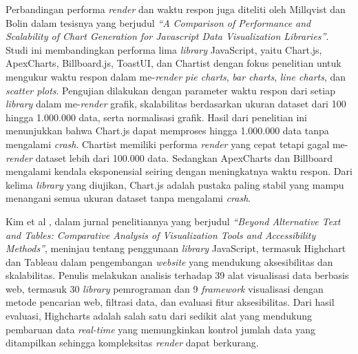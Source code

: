 Perbandingan performa \textit{render} dan waktu respon juga diteliti oleh Millqvist dan Bolin \cite{Millqvist2022} dalam tesisnya yang berjudul \textit{“A Comparison of Performance and Scalability of Chart Generation for Javascript Data Visualization Libraries”}. Studi ini membandingkan performa lima \textit{library} JavaScript, yaitu Chart.js, ApexCharts, Billboard.js, ToastUI, dan Chartist dengan fokus penelitian untuk mengukur waktu respon dalam me-\textit{render} \textit{pie charts}, \textit{bar charts}, \textit{line charts}, dan \textit{scatter plots}. Pengujian dilakukan dengan parameter waktu respon dari setiap \textit{library} dalam me-\textit{render} grafik, skalabilitas berdasarkan ukuran dataset dari 100 hingga 1.000.000 data, serta normalisasi grafik. Hasil dari penelitian ini menunjukkan bahwa Chart.js dapat memproses hingga 1.000.000 data tanpa mengalami \textit{crash}. Chartist memiliki performa \textit{render} yang cepat tetapi gagal me-\textit{render} dataset lebih dari 100.000 data. Sedangkan ApexCharts dan Billboard mengalami kendala eksponensial seiring dengan meningkatnya waktu respon. Dari kelima \textit{library} yang diujikan, Chart.js adalah pustaka paling stabil yang mampu menangani semua ukuran dataset tanpa mengalami \textit{crash}. 

Kim et al \cite{Kim2023}, dalam jurnal penelitiannya yang berjudul \textit{“Beyond Alternative Text and Tables: Comparative Analysis of Visualization Tools and Accessibility Methods”}, meninjau tentang penggunaan \textit{library} JavaScript, termasuk Highchart dan Tableau dalam pengembangan \textit{website} yang mendukung aksesibilitas dan skalabilitas. Penulis melakukan analisis terhadap 39 alat visualisasi data berbasis web, termasuk 30 \textit{library} pemrograman dan 9 \textit{framework} visualisasi dengan metode pencarian web, filtrasi data, dan evaluasi fitur aksesibilitas. Dari hasil evaluasi, Highcharts adalah salah satu dari sedikit alat yang mendukung pembaruan data \textit{real-time} yang memungkinkan kontrol jumlah data yang ditampilkan sehingga kompleksitas \textit{render} dapat berkurang. 

